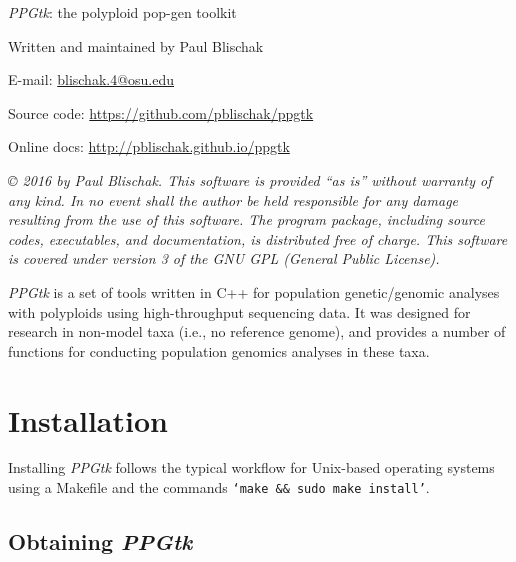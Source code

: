 \documentclass[11pt,english,letterpaper,oneside]{article}
\newcommand{\ppgtk}{\textit{PPGtk}}
\begin{document}
\pagestyle{empty}

\vspace*{1.5in}
\begin{center}

	{\huge \ppgtk: the polyploid pop-gen toolkit}
	\vspace{0.5in}
	
	Written and maintained by Paul Blischak
	
	E-mail: \href{mailto:blischak.4@osu.edu}{blischak.4@osu.edu}
	
	Source code: \url{https://github.com/pblischak/ppgtk}
	
	Online docs: \url{http://pblischak.github.io/ppgtk}
	
\end{center}

\vspace{4in}

{\small \textit{\copyright{} 2016 by Paul Blischak. This software is provided ``as is'' without warranty of any kind. In no event shall the author be held responsible for any damage resulting from the use of this software. The program package, including source codes, executables, and documentation, is distributed free of charge. This software is covered under version 3 of the GNU GPL (General Public License).}}

\newpage

\tableofcontents

\newpage

\clearpage
\pagestyle{plain}
\setcounter{page}{1}

\ppgtk{} is a set of tools written in C++ for population genetic/genomic analyses with polyploids using high-throughput sequencing data. It was designed for research in non-model taxa (i.e., no reference genome), and provides a number of functions for conducting population genomics analyses in these taxa.

\section{Installation}

Installing \ppgtk{} follows the typical workflow for Unix-based operating systems using a Makefile and the commands \texttt{`make \&\& sudo make install'}. 

\subsection{Obtaining \ppgtk}
\end{document}
